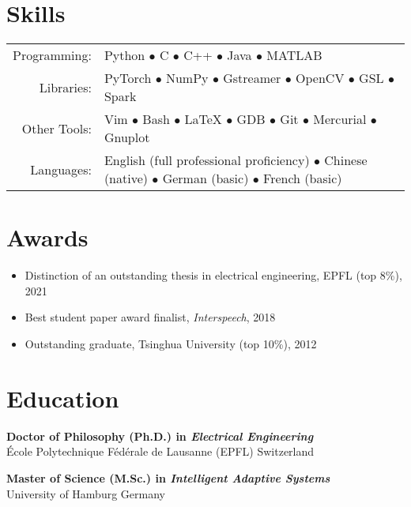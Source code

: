 \documentclass[a4paper,9pt]{extarticle} %
\newcommand{\ind}{\hspace*{1em}}
\begin{document}
\section{Skills}

\begin{tabular}{rl}
  Programming: & Python $\bullet$ C $\bullet$ C++ $\bullet$ Java $\bullet$ MATLAB \\
  Libraries: & PyTorch $\bullet$ NumPy $\bullet$ Gstreamer $\bullet$ OpenCV $\bullet$ GSL $\bullet$ Spark \\
  Other Tools: & Vim $\bullet$ Bash $\bullet$ \LaTeX{} $\bullet$ GDB $\bullet$ Git $\bullet$ Mercurial $\bullet$ Gnuplot \\
  Languages: & English (full professional proficiency) $\bullet$ Chinese (native) $\bullet$ German (basic) $\bullet$ French (basic) \\
\end{tabular}


\section{Awards}

\begin{itemize}[itemsep=-.9em]
  \item Distinction of an outstanding thesis in electrical engineering, EPFL (top 8\%), 2021
  \item Best student paper award finalist, \textit{Interspeech}, 2018
  \item Outstanding graduate, Tsinghua University (top 10\%), 2012
\end{itemize}


\section{Education}
\parbox{\textwidth}{%
\textbf{Doctor of Philosophy (Ph.D.) in \textit{Electrical Engineering}} \\
\ind{} \'Ecole Polytechnique F\'ed\'erale de Lausanne (EPFL) \hfill Switzerland
}

\parbox{\textwidth}{%
\textbf{Master of Science (M.Sc.) in \textit{Intelligent Adaptive Systems}} \\
\ind{} University of Hamburg \hfill Germany
}
\end{document}
